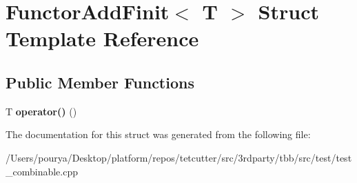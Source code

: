 \hypertarget{structFunctorAddFinit}{}\section{Functor\+Add\+Finit$<$ T $>$ Struct Template Reference}
\label{structFunctorAddFinit}
\subsection*{Public Member Functions}
\begin{DoxyCompactItemize}
\item 
\hypertarget{structFunctorAddFinit_a28d65579a75ce43be9a10166784c0e8b}{}T {\bfseries operator()} ()\label{structFunctorAddFinit_a28d65579a75ce43be9a10166784c0e8b}

\end{DoxyCompactItemize}


The documentation for this struct was generated from the following file\+:\begin{DoxyCompactItemize}
\item 
/\+Users/pourya/\+Desktop/platform/repos/tetcutter/src/3rdparty/tbb/src/test/test\+\_\+combinable.\+cpp\end{DoxyCompactItemize}
